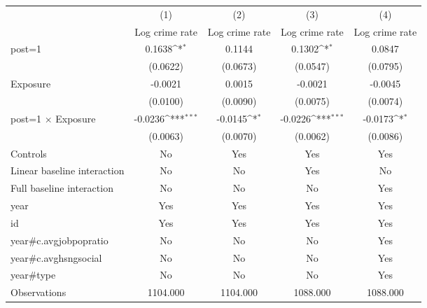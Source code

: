 {
\def\sym#1{\ifmmode^{#1}\else\(^{#1}\)\fi}
\begin{tabular}{l*{4}{c}}
\toprule
                &\multicolumn{1}{c}{(1)}&\multicolumn{1}{c}{(2)}&\multicolumn{1}{c}{(3)}&\multicolumn{1}{c}{(4)}\\
                &\multicolumn{1}{c}{Log crime rate}&\multicolumn{1}{c}{Log crime rate}&\multicolumn{1}{c}{Log crime rate}&\multicolumn{1}{c}{Log crime rate}\\
\midrule
post=1          &   0.1638\sym{*}  &   0.1144         &   0.1302\sym{*}  &   0.0847         \\
                & (0.0622)         & (0.0673)         & (0.0547)         & (0.0795)         \\
\addlinespace
Exposure        &  -0.0021         &   0.0015         &  -0.0021         &  -0.0045         \\
                & (0.0100)         & (0.0090)         & (0.0075)         & (0.0074)         \\
\addlinespace
post=1 $\times$ Exposure&  -0.0236\sym{***}&  -0.0145\sym{*}  &  -0.0226\sym{***}&  -0.0173\sym{*}  \\
                & (0.0063)         & (0.0070)         & (0.0062)         & (0.0086)         \\
\addlinespace
Controls        &     {No}         &    {Yes}         &    {Yes}         &    {Yes}         \\
\addlinespace
Linear baseline interaction &     {No}         &     {No}         &    {Yes}         &     {No}         \\
\addlinespace
Full baseline interaction&     {No}         &     {No}         &     {No}         &    {Yes}         \\
\addlinespace
year            &    {Yes}         &    {Yes}         &    {Yes}         &    {Yes}         \\
\addlinespace
id              &    {Yes}         &    {Yes}         &    {Yes}         &    {Yes}         \\
\addlinespace
year#c.avgjobpopratio&     {No}         &     {No}         &     {No}         &    {Yes}         \\
\addlinespace
year#c.avghsngsocial&     {No}         &     {No}         &     {No}         &    {Yes}         \\
\addlinespace
year#type       &     {No}         &     {No}         &     {No}         &    {Yes}         \\
\midrule
Observations    & 1104.000         & 1104.000         & 1088.000         & 1088.000         \\

\end{tabular}}
